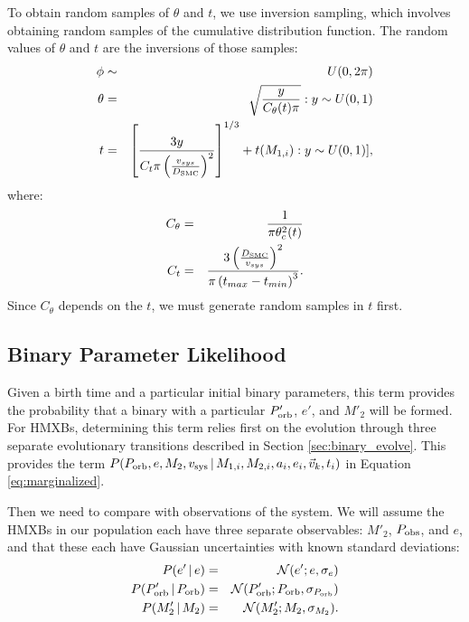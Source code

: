 \documentclass[12pt, preprint]{aastex}
\newcommand{\given}{\,|\,}
\begin{document}
 To obtain random samples of $\theta$ and $t$, we use inversion sampling, which involves obtaining random samples of the cumulative distribution function. The random values of $\theta$ and $t$ are the inversions of those samples:
 \begin{eqnarray}
\phi &\sim& U(0, 2\pi) \\
\theta &=& \sqrt{\frac{y}{C_{\theta}(t) \pi}}: y \sim U(0,1) \\
t &=& \left[ \frac{3y}{C_t \pi \left( \frac{v_{sys}}{D_{\rm SMC}} \right)^2} \right]^{1/3} + t(M_{1,i}): y \sim U(0,1)], 
\end{eqnarray}
where:
\begin{eqnarray}
C_{\theta} &=& \frac{1}{\pi \theta_c^2(t)} \\
C_t &=& \frac{ 3 \left( \frac{D_{\rm SMC}}{v_{sys}} \right)^2 }{ \pi \left( t_{max} - t_{min} \right)^3 }.
\end{eqnarray}
Since $C_{\theta}$ depends on the $t$, we must generate random samples in $t$ first. 





\subsection{Binary Parameter Likelihood}

Given a birth time and a particular initial binary parameters, this term provides the probability that a binary with a particular $P'_{\rm orb}$, $e'$, and $M'_2$ will be formed. For HMXBs, determining this term relies first on the evolution through three separate evolutionary transitions described in Section \ref{sec:binary_evolve}. This provides the term $P(P_{\rm orb}, e, M_2, v_{\rm sys} \given M_{1,i}, M_{2,i}, a_i, e_i, \vec{v}_k, t_i)$ in Equation \ref{eq:marginalized}. 

Then we need to compare with observations of the system. We will assume the HMXBs in our population each have three separate observables: $M'_2$, $P_{\rm obs}$, and $e$, and that these each have Gaussian uncertainties with known standard deviations:
\begin{eqnarray}
P(e' \given e) &=& \mathcal{N}(e' ; e, \sigma_e) \\
P(P_{\rm orb}' \given P_{\rm orb}) &=& \mathcal{N}(P_{\rm orb}' ; P_{\rm orb}, \sigma_{P_{\rm orb}}) \\
P(M'_2 \given M_2) &=& \mathcal{N}(M'_2; M_2, \sigma_{M_2}).
\end{eqnarray}
\end{document}
